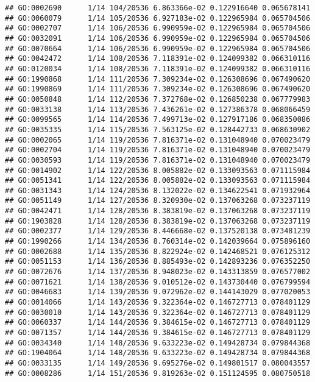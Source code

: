 \documentclass[
]{article}
\begin{document}
\begin{verbatim}
## GO:0002690      1/14 104/20536 6.863366e-02 0.122916640 0.065678141
## GO:0060079      1/14 105/20536 6.927183e-02 0.122965984 0.065704506
## GO:0002707      1/14 106/20536 6.990959e-02 0.122965984 0.065704506
## GO:0032091      1/14 106/20536 6.990959e-02 0.122965984 0.065704506
## GO:0070664      1/14 106/20536 6.990959e-02 0.122965984 0.065704506
## GO:0042472      1/14 108/20536 7.118391e-02 0.124099382 0.066310116
## GO:0120034      1/14 108/20536 7.118391e-02 0.124099382 0.066310116
## GO:1990868      1/14 111/20536 7.309234e-02 0.126308696 0.067490620
## GO:1990869      1/14 111/20536 7.309234e-02 0.126308696 0.067490620
## GO:0050848      1/14 112/20536 7.372768e-02 0.126850238 0.067779983
## GO:0033138      1/14 113/20536 7.436261e-02 0.127386378 0.068066459
## GO:0099565      1/14 114/20536 7.499713e-02 0.127917186 0.068350086
## GO:0035335      1/14 115/20536 7.563125e-02 0.128442733 0.068630902
## GO:0002065      1/14 119/20536 7.816371e-02 0.131048940 0.070023479
## GO:0002704      1/14 119/20536 7.816371e-02 0.131048940 0.070023479
## GO:0030593      1/14 119/20536 7.816371e-02 0.131048940 0.070023479
## GO:0014902      1/14 122/20536 8.005882e-02 0.133093563 0.071115984
## GO:0051341      1/14 122/20536 8.005882e-02 0.133093563 0.071115984
## GO:0031343      1/14 124/20536 8.132022e-02 0.134622541 0.071932964
## GO:0051149      1/14 127/20536 8.320930e-02 0.137063268 0.073237119
## GO:0042471      1/14 128/20536 8.383819e-02 0.137063268 0.073237119
## GO:1903828      1/14 128/20536 8.383819e-02 0.137063268 0.073237119
## GO:0002377      1/14 129/20536 8.446668e-02 0.137520138 0.073481239
## GO:1990266      1/14 134/20536 8.760314e-02 0.142039664 0.075896160
## GO:0002688      1/14 135/20536 8.822924e-02 0.142468521 0.076125312
## GO:0051153      1/14 136/20536 8.885493e-02 0.142893236 0.076352250
## GO:0072676      1/14 137/20536 8.948023e-02 0.143313859 0.076577002
## GO:0071621      1/14 138/20536 9.010512e-02 0.143730440 0.076799594
## GO:0046683      1/14 139/20536 9.072962e-02 0.144143029 0.077020053
## GO:0014066      1/14 143/20536 9.322364e-02 0.146727713 0.078401129
## GO:0030010      1/14 143/20536 9.322364e-02 0.146727713 0.078401129
## GO:0060337      1/14 144/20536 9.384615e-02 0.146727713 0.078401129
## GO:0071357      1/14 144/20536 9.384615e-02 0.146727713 0.078401129
## GO:0034340      1/14 148/20536 9.633223e-02 0.149428734 0.079844368
## GO:1904064      1/14 148/20536 9.633223e-02 0.149428734 0.079844368
## GO:0033135      1/14 149/20536 9.695276e-02 0.149801517 0.080043557
## GO:0008286      1/14 151/20536 9.819263e-02 0.151124595 0.080750518

\end{verbatim}
\end{document}
